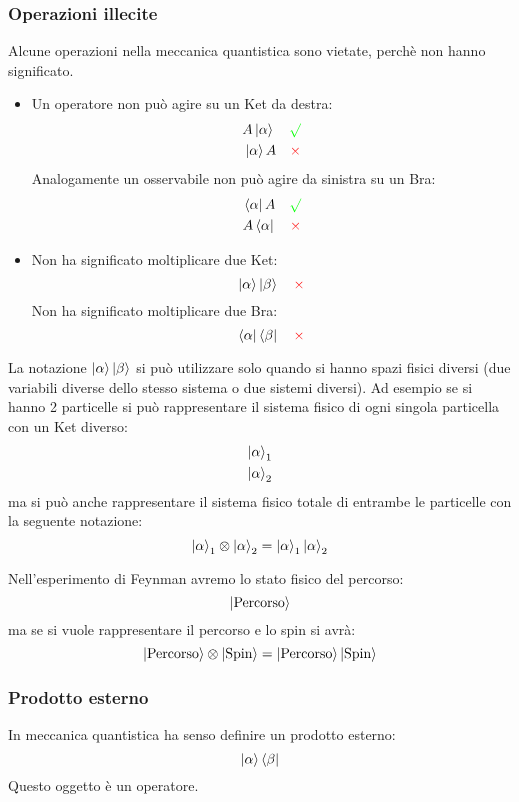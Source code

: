 \documentclass[a4paper]{article}
\begin{document}
\subsubsection{Operazioni illecite}
Alcune operazioni nella meccanica quantistica sono vietate, perchè non hanno significato.
\begin{itemize}
  \item Un operatore non può agire su un Ket da destra:
    \[
      \begin{aligned}
        A \ket{\alpha} \quad \color{green}\surd\\
        \ket{\alpha}A \quad \color{red}\times
      \end{aligned}
    \] 
    Analogamente un osservabile non può agire da sinistra su un Bra:
    \[
      \begin{aligned}
        \bra{\alpha}A \quad \color{green}\surd\\
        A\bra{\alpha} \quad \color{red}\times
      \end{aligned}
    \]

  \item Non ha significato moltiplicare due Ket:
    \[
      \ket{\alpha} \ket{\beta} \quad \color{red}\times
    \] 
    Non ha significato moltiplicare due Bra:
    \[
      \bra{\alpha} \bra{\beta} \quad \color{red}\times
    \] 
\end{itemize}

\noindent
La notazione \( \ket{\alpha} \ket{\beta} \) si può utilizzare solo quando si hanno spazi fisici diversi (due variabili
diverse dello stesso sistema o due sistemi diversi). Ad esempio se si hanno 2 particelle
si può rappresentare il sistema fisico di ogni singola particella con un Ket diverso:
\[
  \begin{aligned}
    \ket{\alpha}_1\\
    \ket{\alpha}_2
  \end{aligned}
\]
ma si può anche rappresentare il sistema fisico totale di entrambe le particelle con
la seguente notazione:
\[
  \ket{\alpha}_1 \otimes \ket{\alpha}_2 = \ket{\alpha}_1 \ket{\alpha}_2
\] 

\vspace{1em}
\noindent
Nell'esperimento di Feynman avremo lo stato fisico del percorso:
\[
  \ket{\text{Percorso}}
\] 
ma se si vuole rappresentare il percorso e lo spin si avrà:
\[
  \ket{\text{Percorso}} \otimes \ket{\text{Spin}} = \ket{\text{Percorso}} \ket{\text{Spin}}
\]

\subsubsection{Prodotto esterno}
In meccanica quantistica ha senso definire un prodotto esterno:
\[
  \ket{\alpha} \bra{\beta}
\] 
Questo oggetto è un operatore.
\end{document}
